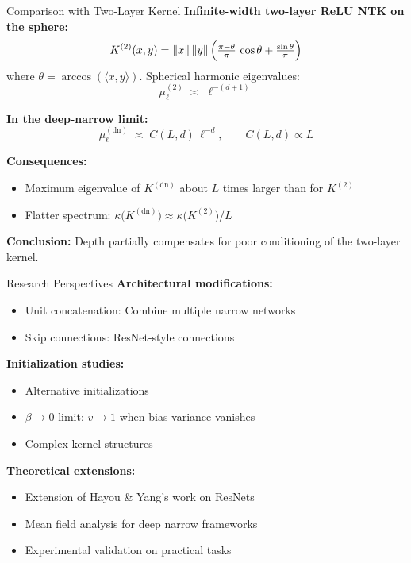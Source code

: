\documentclass{beamer}
\begin{document}
\begin{frame}{Comparison with Two-Layer Kernel}
\textbf{Infinite-width two-layer ReLU NTK on the sphere:}
\[
  K^{(2)}(x,y)=\|x\|\,\|y\|\,\Bigl(\tfrac{\pi-\theta}{\pi}\,\cos \theta + \tfrac{\sin\theta}{\pi}\Bigr)
\]
where $\theta=\arccos(\langle x,y\rangle)$. Spherical harmonic eigenvalues:
\[
  \mu_\ell^{(2)}\;\asymp\;\ell^{-(d+1)}
\]

\textbf{In the deep-narrow limit:}
\[
   \mu_\ell^{(\text{dn})}\;\asymp\;C(L,d)\,\ell^{-d}, \qquad C(L,d)\propto L
\]

\textbf{Consequences:}
\begin{itemize}
  \item Maximum eigenvalue of $K^{(\text{dn})}$ about $L$ times larger than for $K^{(2)}$
  \item Flatter spectrum: $\kappa\bigl(K^{(\text{dn})}\bigr)\approx\kappa\bigl(K^{(2)}\bigr)/L$
\end{itemize}

\textbf{Conclusion:} Depth partially compensates for poor conditioning of the two-layer kernel.
\end{frame}

\begin{frame}{Research Perspectives}
\textbf{Architectural modifications:}
\begin{itemize}
\item Unit concatenation: Combine multiple narrow networks
\item Skip connections: ResNet-style connections
\end{itemize}

\textbf{Initialization studies:}
\begin{itemize}
\item Alternative initializations
\item $\beta \to 0$ limit: $v \to 1$ when bias variance vanishes
\item Complex kernel structures
\end{itemize}

\textbf{Theoretical extensions:}
\begin{itemize}
\item Extension of Hayou \& Yang's work on ResNets
\item Mean field analysis for deep narrow frameworks
\item Experimental validation on practical tasks
\end{itemize}
\end{frame}
\end{document}
